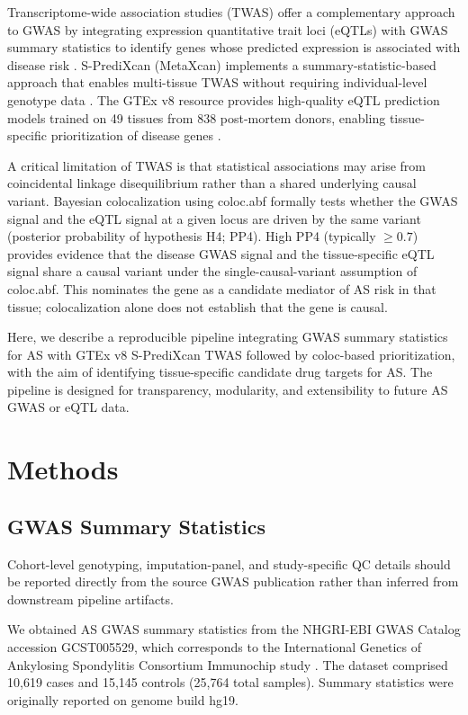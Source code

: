 \documentclass[12pt,a4paper]{article}
\begin{document}
Transcriptome-wide association studies (TWAS) offer a complementary approach
to GWAS by integrating expression quantitative trait loci (eQTLs) with
GWAS summary statistics to identify genes whose predicted expression is
associated with disease risk \citep{Gamazon2015,Barbeira2018}.
S-PrediXcan (MetaXcan) implements a summary-statistic-based approach that
enables multi-tissue TWAS without requiring individual-level genotype data
\citep{Barbeira2018}.
The GTEx v8 resource provides high-quality eQTL prediction models trained
on 49 tissues from 838 post-mortem donors, enabling tissue-specific
prioritization of disease genes \citep{GTExConsortium2020}.

A critical limitation of TWAS is that statistical associations may arise from
coincidental linkage disequilibrium rather than a shared underlying causal
variant.
Bayesian colocalization using coloc.abf \citep{Giambartolomei2014} formally
tests whether the GWAS signal and the eQTL signal at a given locus are driven
by the same variant (posterior probability of hypothesis H4; PP4).
High PP4 (typically $\geq 0.7$) provides evidence that the disease GWAS
signal and the tissue-specific eQTL signal share a causal variant under the
single-causal-variant assumption of coloc.abf. This nominates the gene as a
candidate mediator of AS risk in that tissue; colocalization alone does not
establish that the gene is causal.

Here, we describe a reproducible pipeline integrating GWAS summary statistics
for AS with GTEx v8 S-PrediXcan TWAS followed by coloc-based prioritization,
with the aim of identifying tissue-specific candidate drug targets for AS.
The pipeline is designed for transparency, modularity, and extensibility to
future AS GWAS or eQTL data.

\section{Methods}

\subsection{GWAS Summary Statistics}

Cohort-level genotyping, imputation-panel, and study-specific QC details
should be reported directly from the source GWAS publication rather than
inferred from downstream pipeline artifacts.

We obtained AS GWAS summary statistics from the NHGRI-EBI GWAS Catalog
accession GCST005529, which corresponds to the International Genetics of
Ankylosing Spondylitis Consortium Immunochip study \citep{Cortes2013}. The
dataset comprised 10,619 cases and 15,145 controls (25,764 total samples).
Summary statistics were originally reported on genome build hg19.
\end{document}
